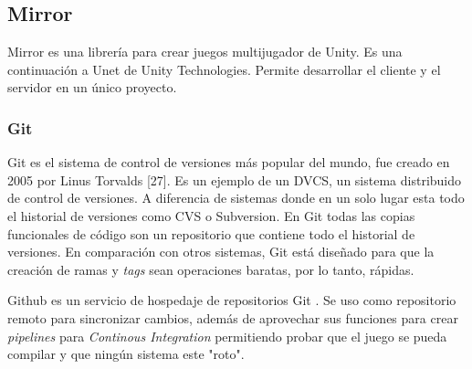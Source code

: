 \subsection{Mirror}
Mirror es una librería para crear juegos multijugador de Unity. Es una continuación a Unet de Unity Technologies. Permite desarrollar el cliente y el servidor en un único proyecto.

\subsubsection{Git}
Git es el sistema de control de versiones más popular del mundo, fue creado en 2005 por Linus Torvalds [27]. Es un ejemplo de un DVCS, un sistema distribuido de control de versiones. A diferencia de sistemas donde en un solo lugar esta todo el historial de versiones como CVS o Subversion. En Git todas las copias funcionales de código son un repositorio que contiene todo el historial de versiones.
En comparación con otros sistemas, Git está diseñado para que la creación de ramas y \textit{tags} sean operaciones baratas, por lo tanto, rápidas.

Github es un servicio de hospedaje de repositorios Git \cite{finley2012a}. Se uso como repositorio remoto para sincronizar cambios, además de aprovechar sus funciones para crear \textit{pipelines} para \textit{Continous Integration} permitiendo probar que el juego se pueda compilar y que ningún sistema este "roto".